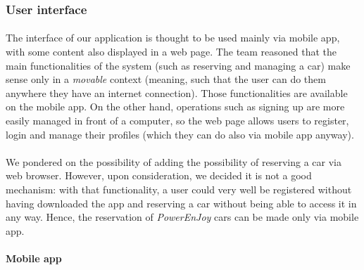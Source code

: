 	\subsubsection{User interface}
	\paragraph{}The interface of our application is thought to be used mainly via mobile app, with some content also displayed in a web page. The team reasoned that the main functionalities of the system (such as reserving and managing a car) make sense only in a \textit{movable} context (meaning, such that the user can do them anywhere they have an internet connection). Those functionalities are available on the mobile app. On the other hand, operations such as signing up are more easily managed in front of a computer, so the web page allows users to register, login and manage their profiles (which they can do also via mobile app anyway).
	\paragraph{}We pondered on the possibility of adding the possibility of reserving a car via web browser. However, upon consideration, we decided it is not a good mechanism: with that functionality, a user could very well be registered without having downloaded the app and reserving a car without being able to access it in any way. Hence, the reservation of \textit{PowerEnJoy} cars can be made only via mobile app. 
	
	\paragraph{Mobile app}\mbox{}\\
	
